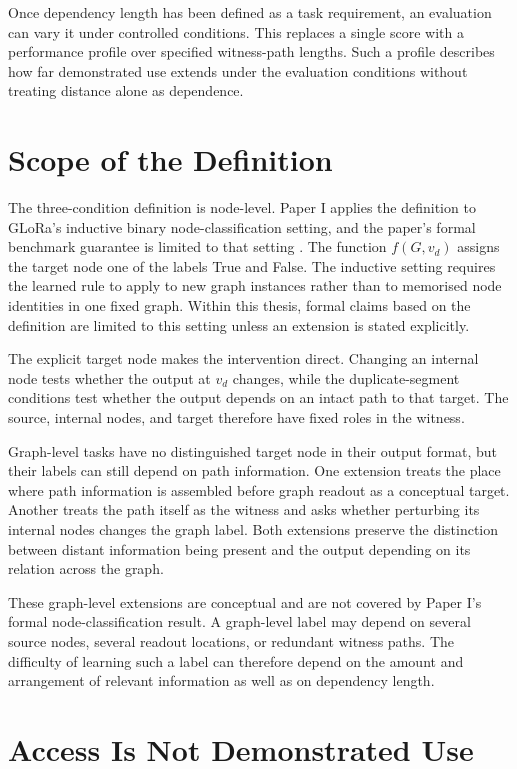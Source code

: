 Once dependency length has been defined as a task requirement, an evaluation can vary it under controlled conditions.
This replaces a single score with a performance profile over specified witness-path lengths.
Such a profile describes how far demonstrated use extends under the evaluation conditions without treating distance alone as dependence.

\section{Scope of the Definition}

The three-condition definition is node-level.
Paper I applies the definition to GLoRa's inductive binary node-classification setting, and the paper's formal benchmark guarantee is limited to that setting \cite{zhou2025glora}.
The function \(f(G,v_d)\) assigns the target node one of the labels True and False.
The inductive setting requires the learned rule to apply to new graph instances rather than to memorised node identities in one fixed graph.
Within this thesis, formal claims based on the definition are limited to this setting unless an extension is stated explicitly.

The explicit target node makes the intervention direct.
Changing an internal node tests whether the output at \(v_d\) changes, while the duplicate-segment conditions test whether the output depends on an intact path to that target.
The source, internal nodes, and target therefore have fixed roles in the witness.

Graph-level tasks have no distinguished target node in their output format, but their labels can still depend on path information.
One extension treats the place where path information is assembled before graph readout as a conceptual target.
Another treats the path itself as the witness and asks whether perturbing its internal nodes changes the graph label.
Both extensions preserve the distinction between distant information being present and the output depending on its relation across the graph.

These graph-level extensions are conceptual and are not covered by Paper I's formal node-classification result.
A graph-level label may depend on several source nodes, several readout locations, or redundant witness paths.
The difficulty of learning such a label can therefore depend on the amount and arrangement of relevant information as well as on dependency length.

\section{Access Is Not Demonstrated Use}

